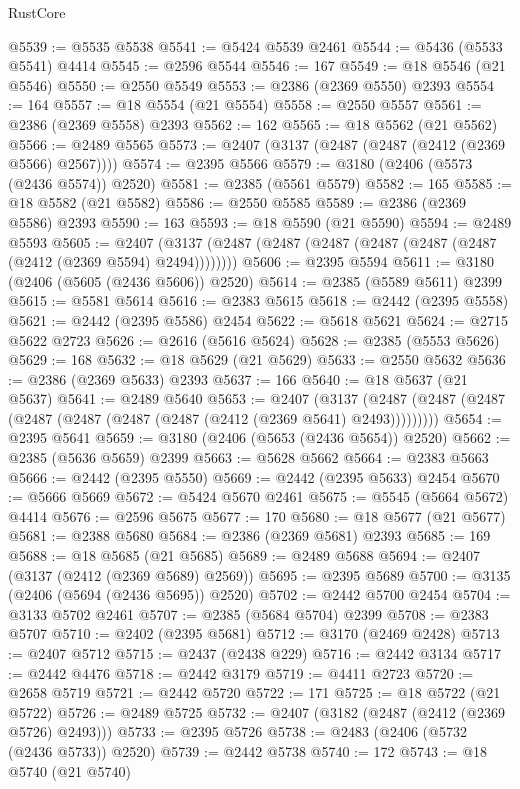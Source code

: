 \begin{lexlean}{RustCore}
\begin{coremodule}
@5539 := @5535 @5538
@5541 := @5424 @5539 @2461
@5544 := @5436 (@5533 @5541) @4414
@5545 := @2596 @5544
@5546 := 167
@5549 := @18 @5546 (@21 @5546)
@5550 := @2550 @5549
@5553 := @2386 (@2369 @5550) @2393
@5554 := 164
@5557 := @18 @5554 (@21 @5554)
@5558 := @2550 @5557
@5561 := @2386 (@2369 @5558) @2393
@5562 := 162
@5565 := @18 @5562 (@21 @5562)
@5566 := @2489 @5565
@5573 := @2407 (@3137 (@2487 (@2487 (@2412 (@2369 @5566) @2567))))
@5574 := @2395 @5566
@5579 := @3180 (@2406 (@5573 (@2436 @5574)) @2520)
@5581 := @2385 (@5561 @5579)
@5582 := 165
@5585 := @18 @5582 (@21 @5582)
@5586 := @2550 @5585
@5589 := @2386 (@2369 @5586) @2393
@5590 := 163
@5593 := @18 @5590 (@21 @5590)
@5594 := @2489 @5593
@5605 := @2407 (@3137 (@2487 (@2487 (@2487 (@2487 (@2487 (@2487 (@2412 (@2369 @5594) @2494))))))))
@5606 := @2395 @5594
@5611 := @3180 (@2406 (@5605 (@2436 @5606)) @2520)
@5614 := @2385 (@5589 @5611) @2399
@5615 := @5581 @5614
@5616 := @2383 @5615
@5618 := @2442 (@2395 @5558)
@5621 := @2442 (@2395 @5586) @2454
@5622 := @5618 @5621
@5624 := @2715 @5622 @2723
@5626 := @2616 (@5616 @5624)
@5628 := @2385 (@5553 @5626)
@5629 := 168
@5632 := @18 @5629 (@21 @5629)
@5633 := @2550 @5632
@5636 := @2386 (@2369 @5633) @2393
@5637 := 166
@5640 := @18 @5637 (@21 @5637)
@5641 := @2489 @5640
@5653 := @2407
    (@3137 (@2487 (@2487 (@2487 (@2487 (@2487 (@2487 (@2487 (@2412 (@2369 @5641) @2493)))))))))
@5654 := @2395 @5641
@5659 := @3180 (@2406 (@5653 (@2436 @5654)) @2520)
@5662 := @2385 (@5636 @5659) @2399
@5663 := @5628 @5662
@5664 := @2383 @5663
@5666 := @2442 (@2395 @5550)
@5669 := @2442 (@2395 @5633) @2454
@5670 := @5666 @5669
@5672 := @5424 @5670 @2461
@5675 := @5545 (@5664 @5672) @4414
@5676 := @2596 @5675
@5677 := 170
@5680 := @18 @5677 (@21 @5677)
@5681 := @2388 @5680
@5684 := @2386 (@2369 @5681) @2393
@5685 := 169
@5688 := @18 @5685 (@21 @5685)
@5689 := @2489 @5688
@5694 := @2407 (@3137 (@2412 (@2369 @5689) @2569))
@5695 := @2395 @5689
@5700 := @3135 (@2406 (@5694 (@2436 @5695)) @2520)
@5702 := @2442 @5700 @2454
@5704 := @3133 @5702 @2461
@5707 := @2385 (@5684 @5704) @2399
@5708 := @2383 @5707
@5710 := @2402 (@2395 @5681)
@5712 := @3170 (@2469 @2428)
@5713 := @2407 @5712
@5715 := @2437 (@2438 @229)
@5716 := @2442 @3134
@5717 := @2442 @4476
@5718 := @2442 @3179
@5719 := @4411 @2723
@5720 := @2658 @5719
@5721 := @2442 @5720
@5722 := 171
@5725 := @18 @5722 (@21 @5722)
@5726 := @2489 @5725
@5732 := @2407 (@3182 (@2487 (@2412 (@2369 @5726) @2493)))
@5733 := @2395 @5726
@5738 := @2483 (@2406 (@5732 (@2436 @5733)) @2520)
@5739 := @2442 @5738
@5740 := 172
@5743 := @18 @5740 (@21 @5740)

\end{coremodule}
\end{lexlean}
